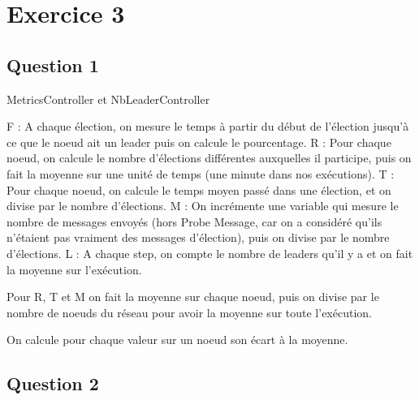 \documentclass[paper=a4, fontsize=11pt]{article} %
\begin{document}
\newpage
\section{Exercice 3}

\subsection{Question 1}
MetricsController et NbLeaderController


F : A chaque élection, on mesure le temps à partir du début de l'élection jusqu'à ce que le noeud ait un leader puis on calcule le pourcentage. \newline
R : Pour chaque noeud, on calcule le nombre d'élections différentes auxquelles il participe, puis on fait la moyenne sur une unité de temps (une minute dans nos exécutions). \newline
T : Pour chaque noeud, on calcule le temps moyen passé dans une élection, et on divise par le nombre d'élections. \newline
M : On incrémente une variable qui mesure le nombre de messages envoyés (hors Probe Message, car on a considéré qu'ils n'étaient pas vraiment des messages d'élection), puis on divise par le nombre d'élections.
L : A chaque step, on compte le nombre de leaders qu'il y a et on fait la moyenne sur l'exécution.

Pour R, T et M on fait la moyenne sur chaque noeud, puis on divise par le nombre de noeuds du réseau pour avoir la moyenne sur toute l'exécution.

On calcule pour chaque valeur sur un noeud son écart à la moyenne.


\subsection{Question 2}
\end{document}
